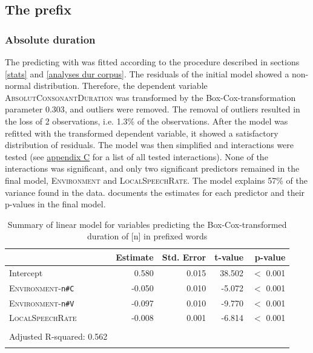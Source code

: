 \subsection{The prefix } \label{un corpus}

\subsubsection{Absolute duration}

The  predicting  with  was fitted according to the procedure described in sections \ref{stats} and \ref{analyses dur corpus}. 
The residuals of the initial model showed a non-normal distribution. Therefore, the dependent variable \textsc{AbsolutConsonantDuration} was transformed by the Box-Cox-transformation parameter $0.303$, and outliers were removed. The removal of outliers resulted in the loss of  2 observations, i.e. 1.3\% of the observations. After the model was refitted with the transformed dependent variable, it showed a satisfactory distribution of residuals. The model was then simplified and interactions were tested  (see \hyperref[Appendix C: Summaries of tested interactions in corpus study]{appendix C} for a list of all tested interactions).
None of the interactions was significant, and only two significant predictors remained in the final model, \textsc{Environment} and  \textsc{LocalSpeechRate}. The model explains 57\% of the variance found in the data.  documents the estimates for each predictor and their p-values in the final model.

\begin{table}[!h]
	\caption{Summary of linear model for variables predicting the Box-Cox-transformed duration of [n] in prefixed words}
	\label{tbl: summary model un}
	
		
		
		\begin{tabular}{lrrrr}
			
			
			\lsptoprule
			& Estimate & Std. Error & t-value & p-value  \\ 
			\midrule
			Intercept                           &   0.580 &  0.015  & 38.502 &  $<$ 0.001\\
			\textsc{Environment}-\texttt{n\#C} & -0.050 &  0.010 & -5.072 & $<$ 0.001\\
			\textsc{Environment}-\texttt{n\#V} & -0.097 &   0.010 & -9.770 & $<$ 0.001\\
			\textsc{LocalSpeechRate} &                 -0.008  & 0.001 &  -6.814 & $<$ 0.001\\
			
			\midrule\\
			Adjusted R-squared: 0.562  \\
			\lspbottomrule
		\end{tabular}

	
\end{table}


